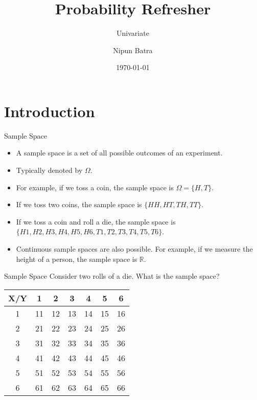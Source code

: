 \documentclass[handout]{beamer}
\begin{document}
\title{Probability Refresher}
\subtitle{Univariate}
\author{Nipun Batra}
\date{\today}
\maketitle

\section{Introduction}

\begin{frame}{Sample Space}
\begin{itemize}
\item A sample space is a set of all possible outcomes of an experiment.
\item Typically denoted by $\Omega$.
\item For example, if we toss a coin, the sample space is  $\Omega = \{H, T\}$.
\item If we toss two coins, the sample space is $\{HH, HT, TH, TT\}$.
\item If we toss a coin and roll a die, the sample space is $\{H1, H2, H3, H4, H5, H6, T1, T2, T3, T4, T5, T6\}$.
\item Continuous sample spaces are also possible. For example, if we measure the height of a person, the sample space is $\mathbb{R}$.
\end{itemize}
\end{frame}

\begin{frame}{Sample Space}
    Consider two rolls of a die. What is the sample space?

    \begin{table}[h]
    \centering
    \begin{tabular}{c|cccccc}
    \hline
    X/Y & 1 & 2 & 3 & 4 & 5 & 6 \\
    \hline
    1 & 11 & 12 & 13 & 14 & 15 & 16 \\
    2 & 21 & 22 & 23 & 24 & 25 & 26 \\
    3 & 31 & 32 & 33 & 34 & 35 & 36 \\
    4 & 41 & 42 & 43 & 44 & 45 & 46 \\
    5 & 51 & 52 & 53 & 54 & 55 & 56 \\
    6 & 61 & 62 & 63 & 64 & 65 & 66 \\
    \hline
    \end{tabular}
    \end{table}
    
\end{frame}
\end{document}
